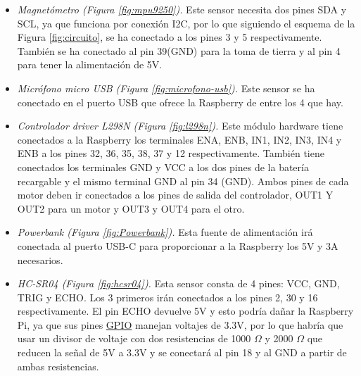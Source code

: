 \begin{itemize}
 \item \textit{Magnetómetro (Figura \ref{fig:mpu9250}).} Este sensor necesita dos pines SDA y SCL, ya que funciona por conexión I2C, por lo que siguiendo el esquema de la Figura \ref{fig:circuito}, se ha conectado a los pines 3 y 5 respectivamente. También se ha conectado al pin 39(GND) para la toma de tierra y al pin 4 para tener la alimentación de  5V. 
 \item \textit{Micrófono micro USB (Figura \ref{fig:microfono-usb}).} Este sensor se ha conectado en el puerto USB que ofrece la Raspberry de entre los 4 que hay.
 \item \textit{Controlador driver L298N (Figura \ref{fig:l298n}).} Este módulo hardware tiene conectados a la Raspberry los terminales ENA, ENB, IN1, IN2, IN3, IN4 y ENB a los pines 32, 36, 35, 38, 37 y 12 respectivamente. También tiene conectados los terminales GND y VCC a los dos pines de la batería recargable y el mismo terminal GND al pin 34 (GND). Ambos pines de cada motor deben ir conectados a los pines de salida del controlador, OUT1 Y OUT2 para un motor y OUT3 y OUT4 para el otro.
 \item \textit{Powerbank (Figura \ref{fig:Powerbank}).} Esta fuente de alimentación irá conectada al puerto USB-C para proporcionar a la Raspberry los 5V y 3A necesarios.
  \item \textit{HC-SR04 (Figura \ref{fig:hcsr04}).} Esta sensor consta de 4 pines: VCC, GND, TRIG y ECHO. Los 3 primeros irán conectados a los pines 2, 30 y 16 respectivamente. El pin ECHO devuelve 5V y esto podría dañar la Raspberry Pi, ya que sus pines \hyperlink{GPIO}{GPIO} manejan voltajes de 3.3V, por lo que habría que usar un divisor de voltaje con dos resistencias de 1000 $\Omega$ y 2000 $\Omega$ que reducen la señal de 5V a 3.3V y se conectará al pin 18 y al GND a partir de ambas resistencias.
\end{itemize}\


